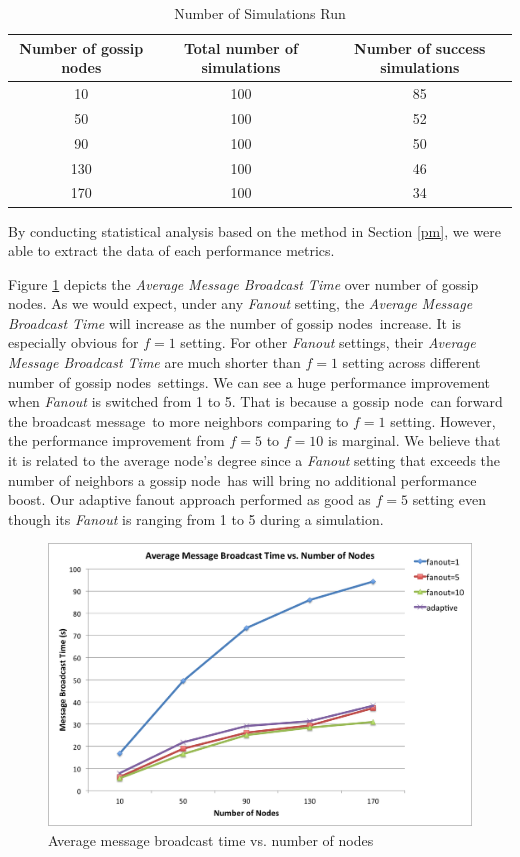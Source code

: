 \documentclass[onehalf,11pt]{beavtex}
\newcommand{\msg}{message}
\newcommand{\gn}{gossip node}
\newcommand{\gns}{gossip nodes}
\newcommand{\ambt}{Average Message Broadcast Time}
\begin{document}
\begin{table}[h]
	\centering
	\caption{Number of Simulations Run}
	\label{table:sim}
	\begin{tabular}{|c|c|c|}
		\hline 
		Number of gossip nodes & Total number of simulations & Number of success simulations \\ 
		\hline 
		10 & 100 & 85 \\ 
		\hline 
		50 & 100 & 52 \\ 
		\hline 
		90 & 100 & 50 \\ 
		\hline 
		130 & 100 & 46 \\ 
		\hline 
		170 & 100 & 34 \\ 
		\hline 
	\end{tabular} 
\end{table}

By conducting statistical analysis based on the method in Section \ref{pm}, we were able to extract the data of each performance metrics. 

Figure \ref{fig:brTime} depicts the \emph{Average Message Broadcast Time} over number of \gns. As we would expect, under any \emph{Fanout} setting, the \emph{\ambt} will increase as the number of \gns ~increase. It is especially obvious for $f=1$ setting. For other \emph{Fanout} settings, their \emph{\ambt} are much shorter than $f=1$ setting across different number of \gns ~settings. We can see a huge performance improvement when \emph{Fanout} is switched from 1 to 5. That is because a \gn ~can forward the broadcast \msg ~to more neighbors comparing to $f=1$ setting. However, the performance improvement from $f=5$ to $f=10$ is marginal. We believe that it is related to the average node's degree since a \emph{Fanout} setting that exceeds the number of neighbors a \gn ~has will bring no additional performance boost. Our adaptive fanout approach performed as good as $f=5$ setting even though its \emph{Fanout} is ranging from 1 to 5 during a simulation. 

\begin{figure} 
	\centering
	\includegraphics[width=5.5in]{brTime.png}
	\caption{Average message broadcast time vs. number of nodes}
	\label{fig:brTime}
\end{figure}
\end{document}

